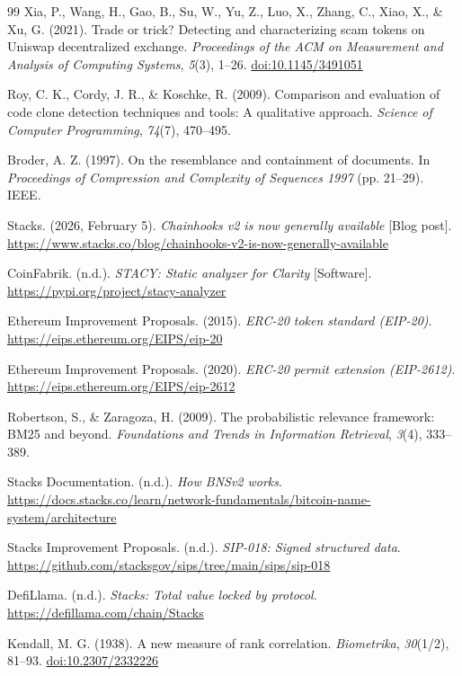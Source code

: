 \begin{thebibliography}{99}
 Xia, P., Wang, H., Gao, B., Su, W., Yu, Z., Luo, X., Zhang, C., Xiao, X., \& Xu, G. (2021). Trade or trick? Detecting and characterizing scam tokens on Uniswap decentralized exchange. \textit{Proceedings of the ACM on Measurement and Analysis of Computing Systems}, \textit{5}(3), 1--26. \href{https://doi.org/10.1145/3491051}{doi:10.1145/3491051}

 Roy, C. K., Cordy, J. R., \& Koschke, R. (2009). Comparison and evaluation of code clone detection techniques and tools: A qualitative approach. \textit{Science of Computer Programming}, \textit{74}(7), 470--495.

 Broder, A. Z. (1997). On the resemblance and containment of documents. In \textit{Proceedings of Compression and Complexity of Sequences 1997} (pp. 21--29). IEEE.

 Stacks. (2026, February 5). \textit{Chainhooks v2 is now generally available} [Blog post]. \url{https://www.stacks.co/blog/chainhooks-v2-is-now-generally-available}

 CoinFabrik. (n.d.). \textit{STACY: Static analyzer for Clarity} [Software]. \url{https://pypi.org/project/stacy-analyzer}

 Ethereum Improvement Proposals. (2015). \textit{ERC-20 token standard (EIP-20)}. \url{https://eips.ethereum.org/EIPS/eip-20}

 Ethereum Improvement Proposals. (2020). \textit{ERC-20 permit extension (EIP-2612)}. \url{https://eips.ethereum.org/EIPS/eip-2612}

 Robertson, S., \& Zaragoza, H. (2009). The probabilistic relevance framework: BM25 and beyond. \textit{Foundations and Trends in Information Retrieval}, \textit{3}(4), 333--389.

 Stacks Documentation. (n.d.). \textit{How BNSv2 works}. \url{https://docs.stacks.co/learn/network-fundamentals/bitcoin-name-system/architecture}

 Stacks Improvement Proposals. (n.d.). \textit{SIP-018: Signed structured data}. \url{https://github.com/stacksgov/sips/tree/main/sips/sip-018}

 DefiLlama. (n.d.). \textit{Stacks: Total value locked by protocol}. \url{https://defillama.com/chain/Stacks}

 Kendall, M. G. (1938). A new measure of rank correlation. \textit{Biometrika}, \textit{30}(1/2), 81--93. \href{https://doi.org/10.2307/2332226}{doi:10.2307/2332226}


\end{thebibliography}
